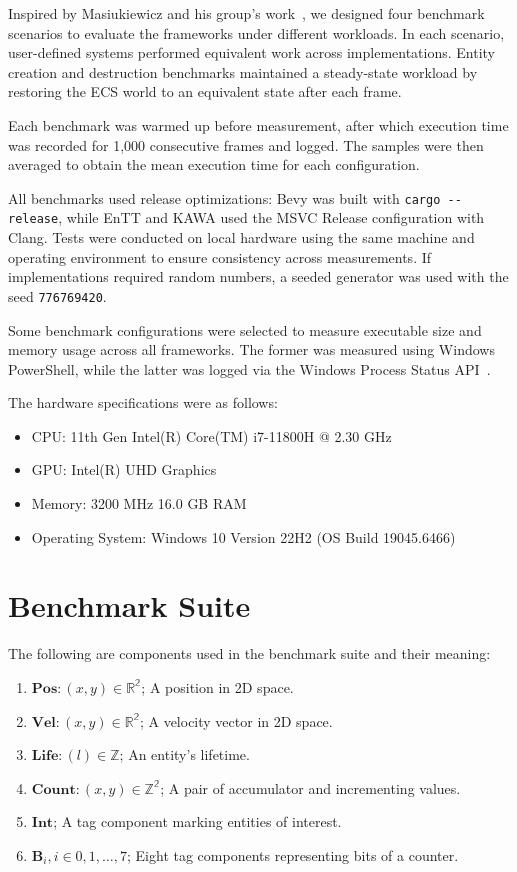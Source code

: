 \documentclass[conference]{IEEEtran}
\begin{document}
    Inspired by Masiukiewicz and his group's work~\cite{evaluation_paper}, we designed four benchmark scenarios to evaluate the frameworks under different workloads.
    In each scenario, user-defined systems performed equivalent work across implementations.
    Entity creation and destruction benchmarks maintained a steady-state workload by restoring the ECS world to an equivalent state after each frame.

    Each benchmark was warmed up before measurement, after which execution time was recorded for 1,000 consecutive frames and logged.
    The samples were then averaged to obtain the mean execution time for each configuration.

    All benchmarks used release optimizations: Bevy was built with \verb|cargo --release|, while EnTT and KAWA used the MSVC Release configuration with Clang.
    Tests were conducted on local hardware using the same machine and operating environment to ensure consistency across measurements.
    If implementations required random numbers, a seeded generator was used with the seed \verb|776769420|.

    Some benchmark configurations were selected to measure executable size and memory usage across all frameworks.
    The former was measured using Windows PowerShell, while the latter was logged via the Windows Process Status API~\cite{microsoft_process_status_api}.

    The hardware specifications were as follows:
    \begin{itemize}
        \item CPU: 11th Gen Intel(R) Core(TM) i7-11800H @ 2.30 GHz
        \item GPU: Intel(R) UHD Graphics
        \item Memory: 3200 MHz 16.0 GB RAM
        \item Operating System: Windows 10 Version 22H2 (OS Build 19045.6466)
    \end{itemize}


    \section{Benchmark Suite}
    \label{sec:benchmark-suite}

    The following are components used in the benchmark suite and their meaning:
    \begin{enumerate}
        \item $\mathbf{Pos}: (x,y) \in \mathbb{R^2}$; A position in 2D space.
        \item $\mathbf{Vel}: (x,y) \in \mathbb{R^2}$; A velocity vector in 2D space.
        \item $\mathbf{Life}: (l) \in \mathbb{Z}$; An entity's lifetime.
        \item $\mathbf{Count}: (x,y) \in \mathbb{Z^2}$; A pair of accumulator and incrementing values.
        \item $\mathbf{Int}$; A tag component marking entities of interest.
        \item $\mathbf{B}_i, i \in {0,1,\ldots,7}$; Eight tag components representing bits of a counter.
    \end{enumerate}
\end{document}
